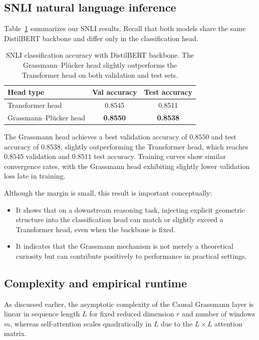 \documentclass[11pt]{article}
\begin{document}
\subsection{SNLI natural language inference}

Table~\ref{tab:snli} summarizes our SNLI results. Recall that both models share the same DistilBERT backbone and differ only in the classification head.

\begin{table}[t]
\centering
\begin{tabular}{lcc}
\toprule
Head type & Val accuracy & Test accuracy \\
\midrule
Transformer head & 0.8545 & 0.8511 \\
Grassmann--Pl\"ucker head & \textbf{0.8550} & \textbf{0.8538} \\
\bottomrule
\end{tabular}
\caption{SNLI classification accuracy with DistilBERT backbone. The Grassmann--Pl\"ucker head slightly outperforms the Transformer head on both validation and test sets.}
\label{tab:snli}
\end{table}

The Grassmann head achieves a best validation accuracy of $0.8550$ and test accuracy of $0.8538$, slightly outperforming the Transformer head, which reaches $0.8545$ validation and $0.8511$ test accuracy. Training curves show similar convergence rates, with the Grassmann head exhibiting slightly lower validation loss late in training.

Although the margin is small, this result is important conceptually:

\begin{itemize}
    \item It shows that on a downstream reasoning task, injecting explicit geometric structure into the classification head can match or slightly exceed a Transformer head, even when the backbone is fixed.
    \item It indicates that the Grassmann mechanism is not merely a theoretical curiosity but can contribute positively to performance in practical settings.
\end{itemize}

\subsection{Complexity and empirical runtime}

As discussed earlier, the asymptotic complexity of the Causal Grassmann layer is linear in sequence length $L$ for fixed reduced dimension $r$ and number of windows $m$, whereas self-attention scales quadratically in $L$ due to the $L\times L$ attention matrix.
\end{document}
